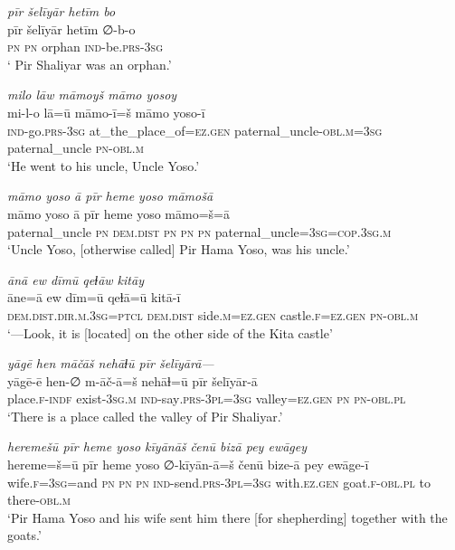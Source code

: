 \ea \label{ŽP.10}
\textit{pīr šelīyār hetīm bo} \\ 
\gll pīr šelīyār hetīm ∅-b-o \\ 
 \textsc{pn} \textsc{pn} orphan \textsc{ind-}be\textsc{.prs}\textsc{-3sg} \\ 
\glt ` Pir Shaliyar was an orphan.'
\z 
 
\ea \label{ŽP.11}
\textit{milo lāw māmoyš māmo yosoy} \\ 
\gll mi-l-o lā=ū māmo-ī=š māmo yoso-ī \\ 
 \textsc{ind-}go\textsc{.prs}\textsc{-3sg} at\_the\_place\_of\textsc{\textsc{=ez.gen}} paternal\_uncle\textsc{-obl}\textsc{.m}\textsc{=3sg} paternal\_uncle \textsc{pn}\textsc{-obl}\textsc{.m} \\ 
\glt `He went to his uncle, Uncle Yoso.'
\z 
 
\ea \label{ŽP.12}
\textit{māmo yoso ā pīr heme yoso māmošā} \\ 
\gll māmo yoso ā pīr heme yoso māmo=š=ā \\ 
 paternal\_uncle \textsc{pn} \textsc{dem.dist} \textsc{pn} \textsc{pn} \textsc{pn} paternal\_uncle\textsc{=3sg}\textsc{=cop}\textsc{.3sg}\textsc{.m} \\ 
\glt `Uncle Yoso, [otherwise called] Pir Hama Yoso, was his uncle.'
\z 
 
\ea \label{ŽP.19}
\textit{ānā ew dīmū qeɫāw kitāy} \\ 
\gll āne=ā ew dīm=ū qeɫā=ū kitā-ī \\ 
 \textsc{dem.dist}\textsc{.dir}\textsc{.m}\textsc{.3sg}=\textsc{ptcl} \textsc{dem.dist} side\textsc{.m}\textsc{\textsc{=ez.gen}} castle\textsc{.f}\textsc{\textsc{=ez.gen}} \textsc{pn}\textsc{-obl}\textsc{.m} \\ 
\glt `—Look, it is [located] on the other side of the Kita castle'
\z 
 
\ea \label{ŽP.20}
\textit{yāgē hen māčāš nehāɫū pīr šelīyārā—} \\ 
\gll yāgē-ē hen-∅ m-āč-ā=š nehāɫ=ū pīr šelīyār-ā \\ 
 place\textsc{.f}\textsc{-indf} exist\textsc{-3sg}\textsc{.m} \textsc{ind-}say\textsc{.prs}\textsc{-3pl}\textsc{=3sg} valley\textsc{\textsc{=ez.gen}} \textsc{pn} \textsc{pn}\textsc{-obl}\textsc{.pl} \\ 
\glt `There is a place called the valley of Pir Shaliyar.'
\z 
 
\ea \label{ŽP.22}
\textit{heremešū pīr heme yoso kīyānāš čenū bizā pey ewāgey} \\ 
\gll hereme=š=ū pīr heme yoso ∅-kīyān-ā=š čenū bize-ā pey ewāge-ī \\ 
 wife\textsc{.f}\textsc{=3sg}=and \textsc{pn} \textsc{pn} \textsc{pn} \textsc{ind-}send\textsc{.prs}\textsc{-3pl}\textsc{=3sg} with\textsc{.ez.gen} goat\textsc{.f}\textsc{-obl}\textsc{.pl} to there\textsc{-obl}\textsc{.m} \\ 
\glt `Pir Hama Yoso and his wife sent him there [for shepherding] together with the goats.'
\z 
 
